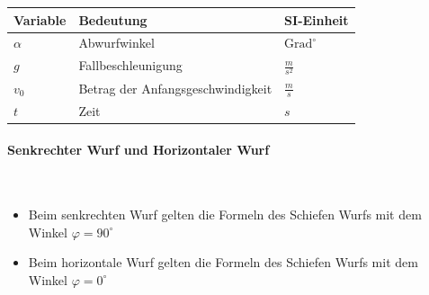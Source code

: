 \documentclass[
a4paper,
oneside,
landscape, 
8pt,
]{scrartcl}
\begin{document}
\begin{multicols*}{2}
\begin{tabbing}
	\begin{tabu} to \linewidth {l X l}
		Variable & Bedeutung & SI-Einheit \\
		\midrule
		$\alpha$ & Abwurfwinkel & $\text{Grad}^\circ$ \\ 
		$g$ & Fallbeschleunigung  & $\frac{m}{s^2}$  \\ 
		$v_0$ & Betrag der Anfangsgeschwindigkeit & $\frac{m}{s}$ \\ 
		$t$ & Zeit & $s$ \\ 
		\bottomrule
	\end{tabu}
\end{tabbing}


\vfill\null
\columnbreak

\paragraph{Senkrechter Wurf und Horizontaler Wurf} \hfill \\

\begin{itemize}
	\item Beim senkrechten Wurf gelten die Formeln des Schiefen Wurfs mit dem Winkel $\varphi = 90^\circ$
	\item Beim horizontale Wurf gelten die Formeln des Schiefen Wurfs mit dem Winkel $\varphi = 0^\circ$
\end{itemize}


\end{multicols*}
\end{document}
